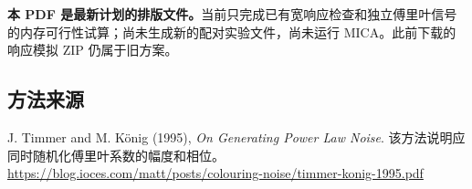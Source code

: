 \documentclass[11pt,a4paper]{article}
\begin{document}
\textbf{{\zhfont 本} PDF {\zhfont 是最新计划的排版文件。}}{\zhfont 当前只完成已有宽响应检查和独立傅里叶信号的内存可行性试算；尚未生成新的配对实验文件，尚未运行} MICA{\zhfont 。此前下载的响应模拟} ZIP {\zhfont 仍属于旧方案。}

\subsection*{{\zhfont 方法来源}}

J. Timmer and M. König (1995), \textit{On Generating Power Law Noise}. {\zhfont 该方法说明应同时随机化傅里叶系数的幅度和相位。}\\
{\small\url{https://blog.ioces.com/matt/posts/colouring-noise/timmer-konig-1995.pdf}}
\end{document}
